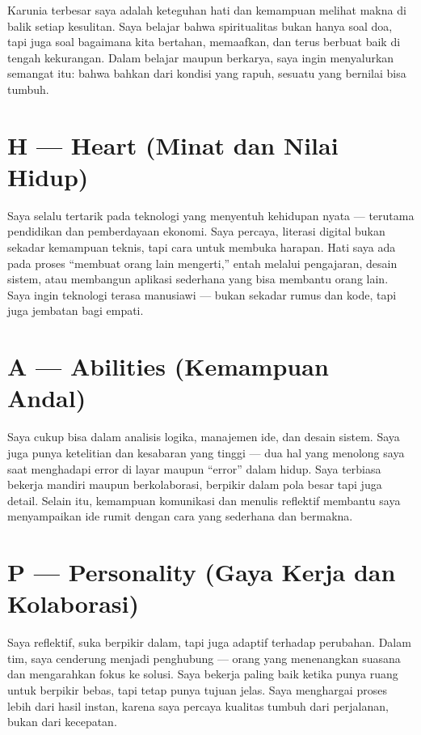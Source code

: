 \documentclass[
  letterpaper,
  DIV=11,
  numbers=noendperiod]{scrreprt}
\begin{document}
Karunia terbesar saya adalah keteguhan hati dan kemampuan melihat makna
di balik setiap kesulitan. Saya belajar bahwa spiritualitas bukan hanya
soal doa, tapi juga soal bagaimana kita bertahan, memaafkan, dan terus
berbuat baik di tengah kekurangan. Dalam belajar maupun berkarya, saya
ingin menyalurkan semangat itu: bahwa bahkan dari kondisi yang rapuh,
sesuatu yang bernilai bisa tumbuh.

\section{H --- Heart (Minat dan Nilai
Hidup)}\label{h-heart-minat-dan-nilai-hidup}

Saya selalu tertarik pada teknologi yang menyentuh kehidupan nyata ---
terutama pendidikan dan pemberdayaan ekonomi. Saya percaya, literasi
digital bukan sekadar kemampuan teknis, tapi cara untuk membuka harapan.
Hati saya ada pada proses ``membuat orang lain mengerti,'' entah melalui
pengajaran, desain sistem, atau membangun aplikasi sederhana yang bisa
membantu orang lain. Saya ingin teknologi terasa manusiawi --- bukan
sekadar rumus dan kode, tapi juga jembatan bagi empati.

\section{A --- Abilities (Kemampuan
Andal)}\label{a-abilities-kemampuan-andal}

Saya cukup bisa dalam analisis logika, manajemen ide, dan desain sistem.
Saya juga punya ketelitian dan kesabaran yang tinggi --- dua hal yang
menolong saya saat menghadapi error di layar maupun ``error'' dalam
hidup. Saya terbiasa bekerja mandiri maupun berkolaborasi, berpikir
dalam pola besar tapi juga detail. Selain itu, kemampuan komunikasi dan
menulis reflektif membantu saya menyampaikan ide rumit dengan cara yang
sederhana dan bermakna.

\section{P --- Personality (Gaya Kerja dan
Kolaborasi)}\label{p-personality-gaya-kerja-dan-kolaborasi}

Saya reflektif, suka berpikir dalam, tapi juga adaptif terhadap
perubahan. Dalam tim, saya cenderung menjadi penghubung --- orang yang
menenangkan suasana dan mengarahkan fokus ke solusi. Saya bekerja paling
baik ketika punya ruang untuk berpikir bebas, tapi tetap punya tujuan
jelas. Saya menghargai proses lebih dari hasil instan, karena saya
percaya kualitas tumbuh dari perjalanan, bukan dari kecepatan.
\end{document}
